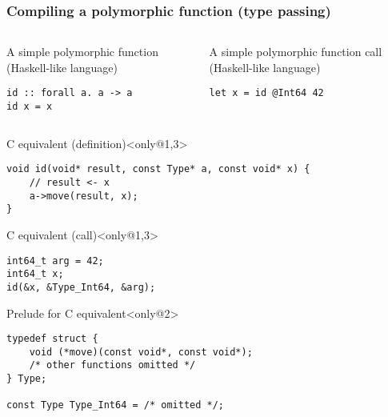 \documentclass[t]{beamer}
\begin{document}
\begin{frame}[fragile]
\frametitle{Compiling a polymorphic function (type passing)}

\begin{columns}
\begin{column}{0.48\textwidth}
\begin{block}{A simple polymorphic function (Haskell-like language)}
\begin{verbatim}
id :: forall a. a -> a
id x = x
\end{verbatim}
\end{block}
\end{column}
\begin{column}{0.48\textwidth}
\begin{block}{A simple polymorphic function call (Haskell-like language)}
\begin{verbatim}
let x = id @Int64 42
\end{verbatim}
\end{block}
\end{column}
\end{columns}

\begin{block}{C equivalent (definition)}<only@1,3>
\begin{verbatim}
void id(void* result, const Type* a, const void* x) {
    // result <- x
    a->move(result, x);
}
\end{verbatim}
\end{block}

\begin{block}{C equivalent (call)}<only@1,3>
\begin{verbatim}
int64_t arg = 42;
int64_t x;
id(&x, &Type_Int64, &arg);
\end{verbatim}
\end{block}

\begin{block}{Prelude for C equivalent}<only@2>
\small
\begin{verbatim}
typedef struct {
    void (*move)(const void*, const void*);
    /* other functions omitted */
} Type;

const Type Type_Int64 = /* omitted */;
\end{verbatim}
\end{block}


\end{frame}
\end{document}
